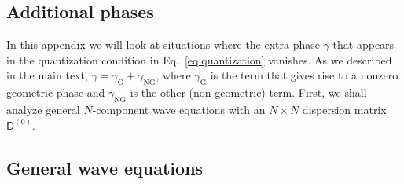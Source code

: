 \begin{subappendices}

\section{Additional phases}
\label{app:additional_phase}

In this appendix we will look at situations where the extra phase $\gamma$ that appears in the quantization condition in Eq.~\eqref{eq:quantization} vanishes.
As we described in the main text, $\gamma = \gamma_{\text{G}} + \gamma_{\text{NG}}$, where $\gamma_{\text{G}}$ is the term that gives rise to a nonzero geometric phase and $\gamma_{\text{NG}}$ is the other (non-geometric) term.
First, we shall analyze general $N$-component wave equations with an $N\times N$ dispersion matrix $\mathsf{D}^{(0)}$.

\subsection{General wave equations}
\label{app:genwave}


\end{subappendices}
